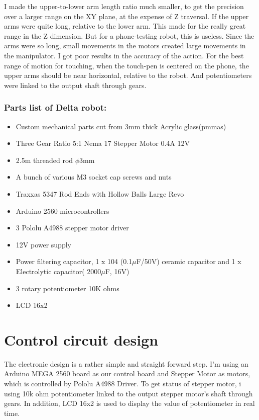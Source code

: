 I made the upper-to-lower arm length ratio much smaller, to get the precision over a larger range on the XY plane, at the expense of Z traversal. If the upper arms were quite long, relative to the lower arm. This made for the really great range in the Z dimension. But for a phone-testing robot, this is useless. Since the arms were so long, small movements in the motors created large movements in the manipulator. I got poor results in the accuracy of the action. For the best range of motion for touching, when the touch-pen is centered on the phone, the upper arms should be near horizontal, relative to the robot.
And potentiometers were linked to the output shaft through gears.

\subsubsection{Parts list of Delta robot:}
\begin{itemize}
		\item Custom mechanical parts cut from 3mm thick Acrylic glass(\glspl{pmma})
		\item Three Gear Ratio 5:1 Nema 17 Stepper Motor 0.4A 12V
		\item 2.5m threaded rod $\phi$3mm
		\item A bunch of various M3 socket cap screws and nuts
		\item Traxxas 5347 Rod Ends with Hollow Balls Large Revo\cite{traxxas_5347_thesis}
		\item Arduino 2560 microcontrollers
		\item 3 Pololu A4988 stepper motor driver
		\item 12V power supply
		\item Power filtering capacitor, 1 x 104 (0.1$\mu$F/50V) ceramic capacitor and 1 x Electrolytic capacitor( 2000$\mu$F, 16V)
		\item 3 rotary potentiometer 10K ohms
		\item LCD 16x2
\end{itemize}


\section{Control circuit design}

The electronic design is a rather simple and straight forward step. I'm using an Arduino MEGA 2560 board as our control board and Stepper Motor as motors, which is controlled by Pololu A4988 Driver. To get status of stepper motor, i using 10k ohm potentiometer linked to the output stepper motor's shaft through gears. In addition, LCD 16x2 is used to display the value of potentiometer in real time.

